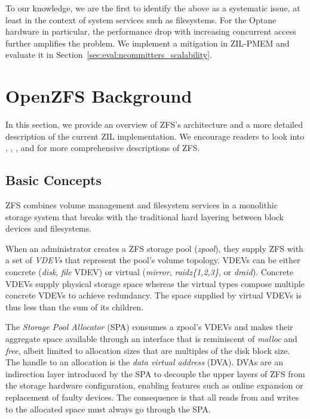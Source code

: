 \documentclass[12pt,a4paper,twoside]{book}
\begin{document}
\begin{description}
        To our knowledge, we are the first to identify the above as a systematic issue, at least in the context of system services such as filesystems.
        For the Optane hardware in particular, the performance drop with increasing concurrent access further amplifies the problem.
        We implement a mitigation in ZIL-PMEM and evaluate it in Section~\ref{sec:eval:ncommitters_scalability}.
\end{description}

\section{OpenZFS Background}\label{sec:openzfs_background}

In this section, we provide an overview of ZFS's architecture and a more detailed description of the current ZIL implementation.
We encourage readers to look into \cite{bonwickZettabyteFileSystem2003}, \cite{zhangEndtoendDataIntegrity2010}, \cite{mckusickDesignImplementationFreeBSD2014}, and \cite{openzfsMattAhrensLecture2016} for more comprehensive descriptions of ZFS.

\subsection{Basic Concepts}\label{sec:openzfs_background:basic_concepts}
ZFS combines volume management and filesystem services in a monolithic storage system that breaks with the traditional hard layering between block devices and filesystems.

When an administrator creates a ZFS storage pool (\textit{zpool}), they supply ZFS with a set of \textit{VDEVs} that represent the pool's volume topology.
VDEVs can be either concrete (\textit{disk}, \textit{file} VDEV) or virtual (\textit{mirror}, \textit{raidz\{1,2,3\}}, or \textit{draid}).
Concrete VDEVs supply physical storage space whereas the virtual types compose multiple concrete VDEVs to achieve redundancy.
The space supplied by virtual VDEVs is thus less than the sum of its children.

The \textit{Storage Pool Allocator} (SPA) consumes a zpool's VDEVs and makes their aggregate space available through an interface that is reminiscent of \textit{malloc} and \textit{free}, albeit limited to allocation sizes that are multiples of the disk block size.
The handle to an allocation is the \textit{data virtual address} (DVA).
DVAs are an indirection layer introduced by the SPA to decouple the upper layers of ZFS from the storage hardware configuration, enabling features such as online expansion or replacement of faulty devices.
The consequence is that all reads from and writes to the allocated space must always go through the SPA.
\end{document}
